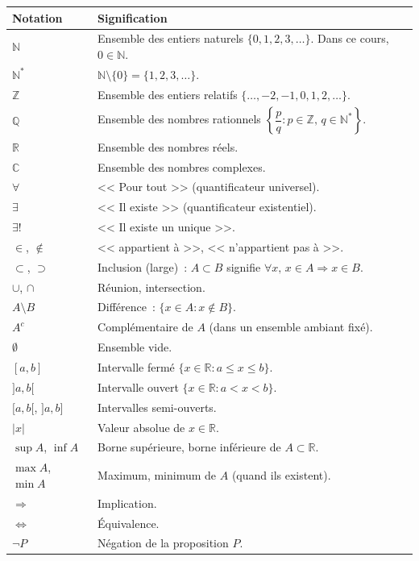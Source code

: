 \documentclass[12pt,a4paper,openany]{book}
\theoremstyle{definition}
\newcommand{\N}{\mathbb{N}}
\newcommand{\Z}{\mathbb{Z}}
\newcommand{\Q}{\mathbb{Q}}
\newcommand{\R}{\mathbb{R}}
\newcommand{\C}{\mathbb{C}}
\newcommand{\abs}[1]{\left\lvert #1 \right\rvert}
\begin{document}
\begin{tabular}{@{}p{3.5cm}p{10cm}@{}}
\toprule
\textbf{Notation} & \textbf{Signification} \\
\midrule
$\N$ & Ensemble des entiers naturels $\{0,1,2,3,\ldots\}$. Dans ce cours, $0 \in \N$. \\[4pt]
$\N^*$ & $\N \setminus \{0\} = \{1,2,3,\ldots\}$. \\[4pt]
$\Z$ & Ensemble des entiers relatifs $\{\ldots,-2,-1,0,1,2,\ldots\}$. \\[4pt]
$\Q$ & Ensemble des nombres rationnels $\left\{\dfrac{p}{q} : p \in \Z,\, q \in \N^*\right\}$. \\[4pt]
$\R$ & Ensemble des nombres réels. \\[4pt]
$\C$ & Ensemble des nombres complexes. \\[4pt]
$\forall$ & << Pour tout >> (quantificateur universel). \\[4pt]
$\exists$ & << Il existe >> (quantificateur existentiel). \\[4pt]
$\exists!$ & << Il existe un unique >>. \\[4pt]
$\in$, $\notin$ & << appartient à >>, << n'appartient pas à >>. \\[4pt]
$\subset$, $\supset$ & Inclusion (large)~: $A \subset B$ signifie $\forall x,\, x \in A \Rightarrow x \in B$. \\[4pt]
$\cup$, $\cap$ & Réunion, intersection. \\[4pt]
$A \setminus B$ & Différence~: $\{x \in A : x \notin B\}$. \\[4pt]
$A^c$ & Complémentaire de $A$ (dans un ensemble ambiant fixé). \\[4pt]
$\emptyset$ & Ensemble vide. \\[4pt]
$[a,b]$ & Intervalle fermé $\{x \in \R : a \leq x \leq b\}$. \\[4pt]
$]a,b[$ & Intervalle ouvert $\{x \in \R : a < x < b\}$. \\[4pt]
$[a,b[$, $]a,b]$ & Intervalles semi-ouverts. \\[4pt]
$\abs{x}$ & Valeur absolue de $x \in \R$. \\[4pt]
$\sup A$, $\inf A$ & Borne supérieure, borne inférieure de $A \subset \R$. \\[4pt]
$\max A$, $\min A$ & Maximum, minimum de $A$ (quand ils existent). \\[4pt]
$\Rightarrow$ & Implication. \\[4pt]
$\Leftrightarrow$ & Équivalence. \\[4pt]
$\lnot P$ & Négation de la proposition $P$. \\[4pt]
\bottomrule
\end{tabular}
\end{document}

